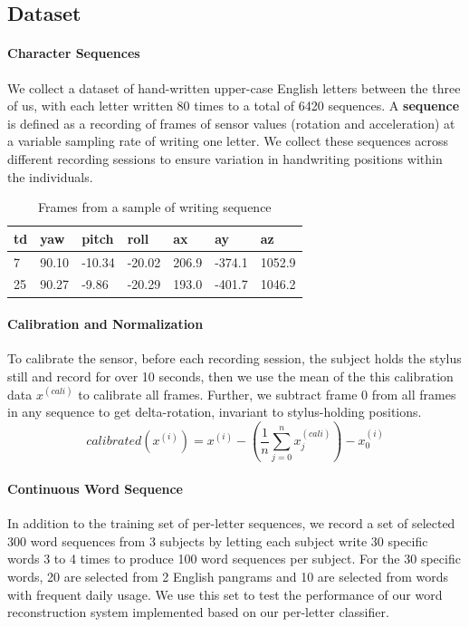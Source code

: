 \documentclass{article}
\newcommand{\xsi}{x^{(i)}}
\begin{document}
\begin{multicols*}{2}
\section{Dataset }

\paragraph{Character Sequences} 
We collect a dataset of hand-written upper-case English letters between the three of us, with each letter written 80 times to a total of 6420 sequences. A \textbf{sequence} is defined as a recording of frames of sensor values (rotation and acceleration) at a variable sampling rate of writing one letter. We collect these sequences across different recording sessions to ensure variation in handwriting positions within the individuals.

\begin{table}[H]
\centering
\begin{tabular}{lllllll}
\hline
td & yaw    & pitch  & roll   & ax     & ay      & az      \\ \hline
7  & 90.10 & -10.34 & -20.02 & 206.9 & -374.1 & 1052.9 \\
25 & 90.27  & -9.86  & -20.29 & 193.0 & -401.7 & 1046.2 \\ \hline
\end{tabular}
\vspace{3pt}
\caption{Frames from a sample of writing sequence}
\label{tab:sample-sequence}
\end{table}
\vspace{-10px}

\paragraph{Calibration and Normalization} 
To calibrate the sensor, before each recording session, the subject holds the stylus still and record for over 10 seconds, then we use the mean of the this calibration data $x^{(cali)}$ to calibrate all frames. Further, we subtract frame 0 from all frames in any sequence to get delta-rotation, invariant to stylus-holding positions. 
\[calibrated(\xsi) = \xsi - (\frac{1}{n} \sum_{j=0}^n x^{(cali)}_j) - \xsi_0\]

\paragraph{Continuous Word Sequence}
In addition to the training set of per-letter sequences, we record a set of selected 300 word sequences from 3 subjects by letting each subject write 30 specific words 3 to 4 times to produce 100 word sequences per subject. For the 30 specific words, 20 are selected from 2 English pangrams and 10 are selected from words with frequent daily usage. We use this set to test the performance of our word reconstruction system implemented based on our per-letter classifier.


\end{multicols*}
\end{document}
